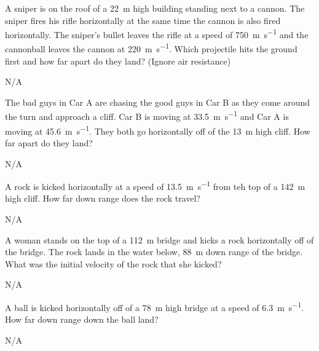 \begin{question}[ID=horizontal-B-Q03,topic=projectiles,difficulty=B]
    A sniper is on the roof of a \SI{22}{\meter} high building
        standing next to a cannon.
    The sniper fires his rifle horizontally at the same
        time the cannon is also fired horizontally.
    The sniper's bullet leaves the rifle at a speed of 
        \SI{750}{\meter\per\second} and the cannonball
        leaves the cannon at \SI{220}{\meter\per\second}.
    Which projectile hits the ground first and how far
        apart do they land?
    (Ignore air resistance)
\end{question}
\begin{solution}
    N/A
\end{solution}


\begin{question}[ID=horizontal-B-Q04,topic=projectiles,difficulty=easy]
    The bad guys in Car A are chasing the good guys in Car B
        as they come around the turn and approach a cliff.
    Car B is moving at \SI{33.5}{\meter\per\second} and 
        Car A is moving at \SI{45.6}{\meter\per\second}.
    They both go horizontally off of the \SI{13}{\meter}
        high cliff.
    How far apart do they land?
\end{question}
\begin{solution}
    N/A
\end{solution}


\begin{question}[ID=horizontal-C-Q01,topic=projectiles,difficulty=C]
    A rock is kicked horizontally at a speed of \SI{13.5}{\meter\per\second}
        from teh top of a \SI{142}{\meter} high cliff.
    How far down range does the rock travel?
\end{question}
\begin{solution}
    N/A
\end{solution}


\begin{question}[ID=horizontal-C-Q03,topic=projectiles,difficulty=C]
    A woman stands on the top of a \SI{112}{\meter} bridge
        and kicks a rock horizontally off of the bridge.
    The rock lands in the water below, \SI{88}{\meter}
        down range of the bridge.
    What was the initial velocity of the rock that she
        kicked?
\end{question}
\begin{solution}
    N/A
\end{solution}


\begin{question}[ID=horizontal-C-Q04,topic=projectiles,difficulty=C]
    A ball is kicked horizontally off of a \SI{78}{\meter}
        high bridge at a speed of \SI{6.3}{\meter\per\second}.
    How far down range down the ball land?
\end{question}
\begin{solution}
    N/A
\end{solution}


